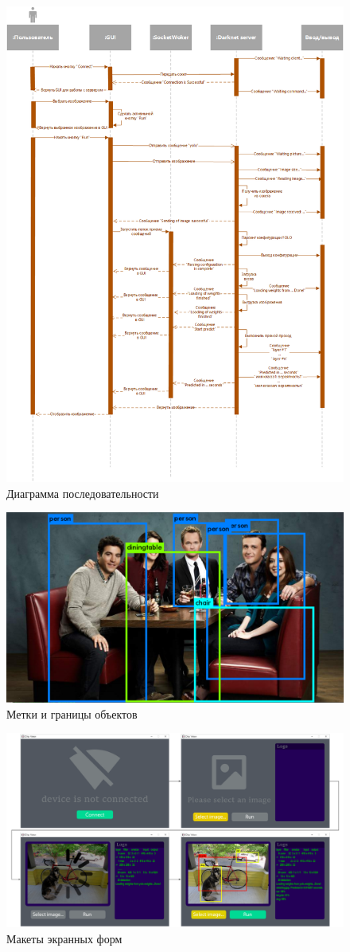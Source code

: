 \documentclass[a4paper,english]{G2-105}
\begin{document}
\begin{figure} 
\includegraphics[width = 0.8 \linewidth]{sequence.png}
\caption{Диаграмма последовательности}\label{seq}
\end{figure}

\begin{figure} 
\includegraphics[width = \linewidth]{photo.png}
\caption{Метки и границы объектов}\label{photo}
\end{figure}


\begin{figure} 
\includegraphics[width = \linewidth]{screens.png}
\caption{Макеты экранных форм}\label{photo}
\end{figure}
\end{document}
